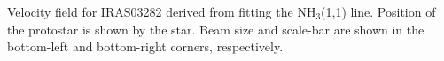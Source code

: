Velocity field for IRAS03282 derived from fitting the NH$_3$(1,1) line. 
Position of the protostar is shown by the star. 
Beam size and scale-bar are shown in the bottom-left and bottom-right corners, respectively.